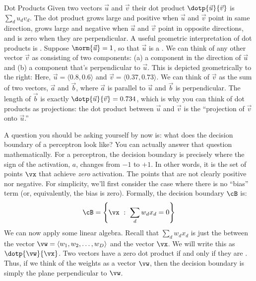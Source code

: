 \begin{mathreview}{Dot Products}
  Given two vectors $\vec u$ and $\vec v$ their dot product $\dotp{\vec u}{\vec v}$ is $\sum_d u_d v_d$.
  The dot product grows large and positive when $\vec u$ and $\vec v$ point in same direction, grows
  large and negative when $\vec u$ and $\vec v$ point in opposite directions, and is zero when they are perpendicular.
  A useful geometric interpretation of dot products is .
  Suppose $\norm{\vec u} = 1$, so that $\vec u$ is a .
  We can think of any other vector $\vec v$ as consisting of two components: (a) a component in the direction of $\vec u$ and (b) a component that's perpendicular to $\vec u$.
  This is depicted geometrically to the right:
  Here, $\vec u = \langle 0.8, 0.6 \rangle$ and $\vec v = \langle 0.37, 0.73 \rangle$.
  We can think of $\vec v$ as the sum of two vectors, $\vec a$ and $\vec b$, where
  $\vec a$ is parallel to $\vec u$ and $\vec b$ is perpendicular.
  The length of $\vec b$ is exactly $\dotp{\vec u}{\vec v} = 0.734$, which is why you can think of
  dot products as projections: the dot product between $\vec u$ and $\vec v$ is the ``projection of $\vec v$ onto $\vec u$.''
\end{mathreview}

A question you should be asking yourself by now is: what does the
decision boundary of a perceptron look like?  You can actually answer
that question mathematically.  For a perceptron, the decision boundary
is precisely where the sign of the activation, $a$, changes from $-1$
to $+1$.  In other words, it is the set of points $\vx$ that achieve
\emph{zero} activation.  The points that are not clearly positive nor
negative.  For simplicity, we'll first consider the case where there
is no ``bias'' term (or, equivalently, the bias is zero).  Formally,
the decision boundary $\cB$ is:
\begin{equation}
\cB = \left\{ \vx ~:~ \sum_d w_d x_d = 0 \right\}
\end{equation}
We can now apply some linear algebra.  Recall that $\sum_d w_d x_d$ is
just the  between the vector $\vw = \langle w_1,
w_2, \dots, w_D \rangle$ and the vector $\vx$.  We will write this as
$\dotp{\vw}{\vx}$.  Two vectors have a zero dot product if and only if
they are .  Thus, if we think of the weights as
a vector $\vw$, then the decision boundary is simply the plane
perpendicular to $\vw$.

